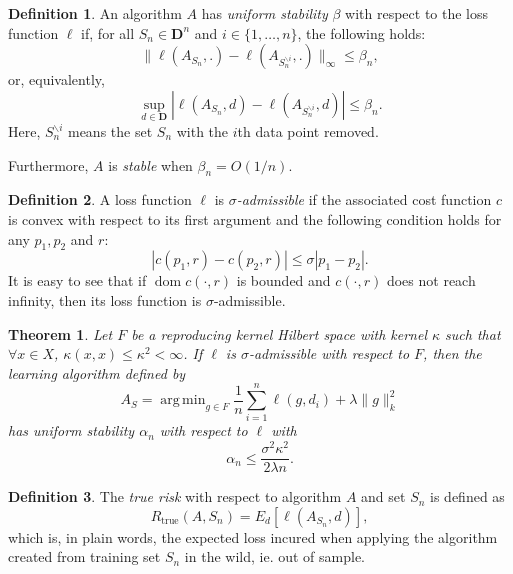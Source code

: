 \documentclass[11pt]{article}
\DeclareMathOperator*{\argmin}{arg\,min}
\DeclareMathOperator{\dom}{dom}
\theoremstyle{plain}
\newtheorem{thm}{Theorem}
\theoremstyle{definition}
\newtheorem*{deff}{Definition}
\begin{document}
\begin{deff}
  An algorithm $A$ has \textit{uniform stability} $\beta$ with respect to the loss
  function $\ell$ if, for all $S_n\in\bm D^n$ and $i\in\{1,\ldots,n\}$, the following
  holds:
  \begin{equation}
    \|\ell(A_{S_n},.) - \ell(A_{S^{\backslash i}_n},.)\|_{\infty} \leq \beta_n,
  \end{equation}
  or, equivalently,
  \begin{equation}
    \sup_{d\in\bm D}|\ell(A_{S_n},d) - \ell(A_{S^{\backslash i}_n},d)| \leq \beta_n.
  \end{equation}
  Here, $S^{\backslash i}_n$ means the set $S_n$ with the $i$th data point removed.

  Furthermore, $A$ is \textit{stable} when $\beta_n = O(1/n)$.
\end{deff}

\begin{deff}
  A loss function $\ell$ is \textit{$\sigma$-admissible} if the associated cost function
  $c$ is convex with respect to its first argument and the following condition holds for
  any $p_1,p_2$ and $r$:
  \begin{equation}
    |c(p_1,r) - c(p_2,r)| \leq \sigma |p_1 - p_2|.
  \end{equation}
  It is easy to see that if $\dom c(\cdot,r)$ is bounded and $c(\cdot,r)$ does not reach
  infinity, then its loss function is $\sigma$-admissible.
\end{deff}

\begin{thm}
  \label{thm1}
  Let $F$ be a reproducing kernel Hilbert space with kernel $\kappa$ such that
  $\forall x\in X$, $\kappa(x,x) \leq \kappa^2 <\infty$. If $\ell$ is $\sigma$-admissible
  with respect to $F$, then the learning algorithm defined by
  \begin{equation}
    \label{eq:above3}
    A_S = \argmin_{g\in F}\frac{1}{n}\sum_{i=1}^n \ell(g,d_i) + \lambda\|g\|^2_k
  \end{equation}
  has uniform stability $\alpha_n$ with respect to $\ell$ with
  \begin{equation}
    \alpha_n \leq \frac{\sigma^2 \kappa^2}{2\lambda n}.
  \end{equation}
\end{thm}

\begin{deff}
  The \emph{true risk} with respect to algorithm $A$ and set $S_n$ is defined as
  \begin{equation}
    R_{\text{true}}(A,S_n) = E_d[\ell(A_{S_n},d)],
  \end{equation}
  which is, in plain words, the expected loss incured when applying the algorithm created
  from training set $S_n$ in the wild, ie. out of sample.
\end{deff}
\end{document}
